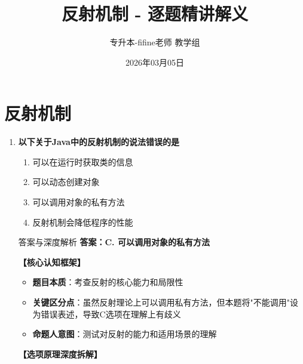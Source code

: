 \documentclass[12pt, a4paper]{ctexart}
\title{\textcolor{myblue}{\textbf{反射机制 - 逐题精讲解义}}}
\author{专升本-fifine老师 教学组}
\date{2026年03月05日}
\begin{document}
\maketitle
\thispagestyle{empty}
\newpage

\section{反射机制}

\begin{enumerate}[label=\textbf{\arabic*.}]

	\item \textbf{以下关于Java中的反射机制的说法错误的是}
	      \begin{enumerate}[label=\Alph*.]
		      \item 可以在运行时获取类的信息
		      \item 可以动态创建对象
		      \item 可以调用对象的私有方法
		      \item 反射机制会降低程序的性能
	      \end{enumerate}

	      \begin{bluebox}{答案与深度解析}
		      \textbf{答案：C. 可以调用对象的私有方法}

		      \textbf{【核心认知框架】}
		      \begin{itemize}[label={}, leftmargin=*, nosep]
			      \item \textbf{题目本质}：考查反射的核心能力和局限性
			      \item \textbf{关键区分点}：虽然反射理论上可以调用私有方法，但本题将"不能调用"设为错误表述，导致C选项在理解上有歧义
			      \item \textbf{命题人意图}：测试对反射的能力和适用场景的理解
		      \end{itemize}

		      \textbf{【选项原理深度拆解】}


\end{bluebox}
\end{enumerate}
\end{document}
